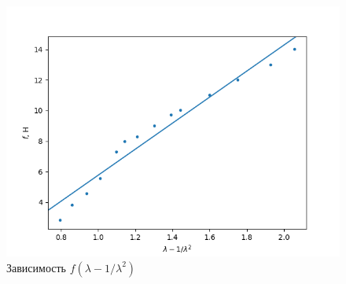 \documentclass[a4paper, 12pt]{article}
\begin{document}
    \begin{figure}
        \centering\includegraphics[width=0.8\linewidth]{img/kek.png}
        \caption{Зависимость $f(\lambda-1/\lambda^2)$}
    \end{figure}
\end{document}
